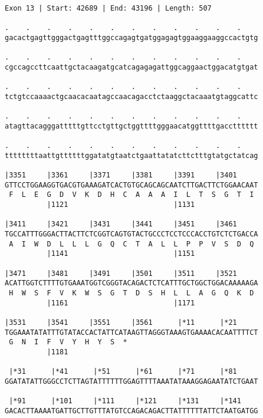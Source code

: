 \documentclass{article}
\begin{document}
\newpage
\begin{Verbatim}[fontfamily=courier]
Exon 13 | Start: 42689 | End: 43196 | Length: 507

.    .    .    .    .    .    .    .    .    .    .    .    
gacactgagttgggactgagtttggccagagtgatggagagtggaaggaaggccactgtg

.    .    .    .    .    .    .    .    .    .    .    .    
cgccagccttcaattgctacaagatgcatcagagagattggcaggaactggacatgtgat

.    .    .    .    .    .    .    .    .    .    .    .    
tctgtccaaaactgcaacacaatagccaacagacctctaaggctacaaatgtaggcattc

.    .    .    .    .    .    .    .    .    .    .    .    
atagttacagggatttttgttcctgttgctggttttgggaacatggttttgacctttttt

.    .    .    .    .    .    .    .    .    .    .    .    
ttttttttaattgttttttggatatgtaatctgaattatatcttctttgtatgctatcag

|3351     |3361     |3371     |3381     |3391     |3401     
GTTCCTGGAAGGTGACGTGAAAGATCACTGTGCAGCAGCAATCTTGACTTCTGGAACAAT
 F  L  E  G  D  V  K  D  H  C  A  A  A  I  L  T  S  G  T  I 
          |1121                         |1131               

|3411     |3421     |3431     |3441     |3451     |3461     
TGCCATTTGGGACTTACTTCTCGGTCAGTGTACTGCCCTCCTCCCACCTGTCTCTGACCA
 A  I  W  D  L  L  L  G  Q  C  T  A  L  L  P  P  V  S  D  Q 
          |1141                         |1151               

|3471     |3481     |3491     |3501     |3511     |3521     
ACATTGGTCTTTTGTGAAATGGTCGGGTACAGACTCTCATTTGCTGGCTGGACAAAAAGA
 H  W  S  F  V  K  W  S  G  T  D  S  H  L  L  A  G  Q  K  D 
          |1161                         |1171               

|3531     |3541     |3551     |3561      |*11      |*21     
TGGAAATATATTTGTATACCACTATTCATAAGTTAGGGTAAAGTGAAAACACAATTTTCT
 G  N  I  F  V  Y  H  Y  S  *   
          |1181                                             

 |*31      |*41      |*51      |*61      |*71      |*81     
GGATATATTGGGCCTCTTAGTATTTTTTGGAGTTTTAAATATAAAGGAGAATATCTGAAT

 |*91      |*101     |*111     |*121     |*131     |*141    
GACACTTAAAATGATTGCTTGTTTATGTCCAGACAGACTTATTTTTTATTCTAATGATGG

\end{Verbatim}
\newpage
\end{document}
